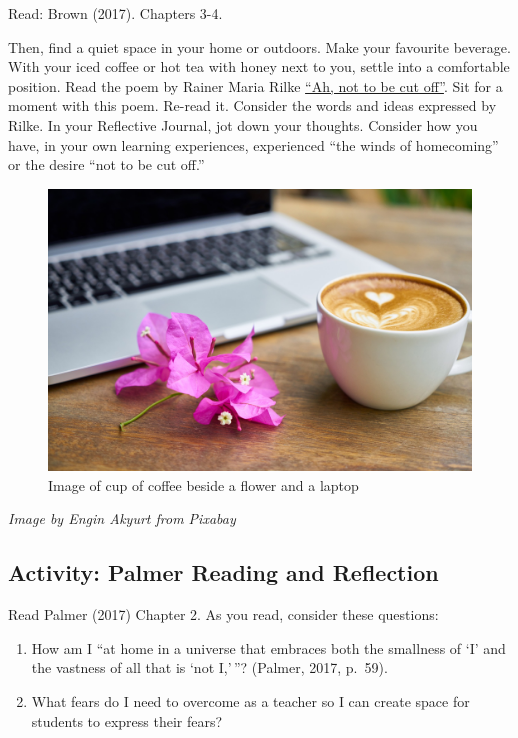 \documentclass[
]{book}
\providecommand{\tightlist}{%
  \setlength{\itemsep}{0pt}\setlength{\parskip}{0pt}}
\begin{document}
\begin{reflect}
Read: Brown (2017). Chapters 3-4.

Then, find a quiet space in your home or outdoors. Make your favourite
beverage. With your iced coffee or hot tea with honey next to you,
settle into a comfortable position. Read the poem by Rainer Maria Rilke
\href{https://gladdestthing.com/poems/ah-not-to-be-cut-off}{``Ah, not to
be cut off''}. Sit for a moment with this poem. Re-read it. Consider the
words and ideas expressed by Rilke. In your Reflective Journal, jot down
your thoughts. Consider how you have, in your own learning experiences,
experienced ``the winds of homecoming'' or the desire ``not to be cut
off.''

\begin{figure}
\centering
\includegraphics{assets/unit3/coffee-2242212_1920.jpg}
\caption{Image of cup of coffee beside a flower and a laptop}
\end{figure}

\emph{Image by Engin Akyurt from Pixabay}
\end{reflect}

\hypertarget{activity-palmer-reading-and-reflection}{%
\subsection{Activity: Palmer Reading and Reflection}\label{activity-palmer-reading-and-reflection}}

\begin{reflect}
Read Palmer (2017) Chapter 2. As you read, consider these questions:

\begin{enumerate}
\def\labelenumi{\arabic{enumi}.}
\tightlist
\item
  How am I ``at home in a universe that embraces both the smallness of
  `I' and the vastness of all that is `not I,'\,''? (Palmer, 2017,
  p.~59).
\item
  What fears do I need to overcome as a teacher so I can create space
  for students to express their fears?
\end{enumerate}
\end{reflect}
\end{document}
